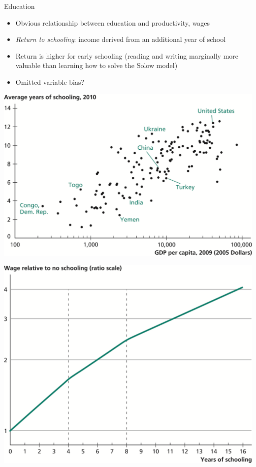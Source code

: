 \documentclass[10pt]{beamer}
\begin{document}
\begin{frame}[label={sec:orga963f28}]{}
\alert{Education}
\begin{itemize}
\item Obvious relationship between education and productivity, wages
\item \emph{Return to schooling}: income derived from an additional year of school
\item Return is higher for early schooling (reading and writing marginally more valuable than learning how to solve the Solow model)
\item Omitted variable bias?
\end{itemize}
\end{frame}

\begin{frame}[label={sec:org984a7ce}]{}
\begin{center}
\includegraphics[width=.75\textwidth]{./img/6.11.png}
\end{center}
\end{frame}

\begin{frame}[label={sec:orgd917e50}]{}
\begin{center}
\includegraphics[width=.75\textwidth]{./img/6.6.png}
\end{center}
\end{frame}
\end{document}

